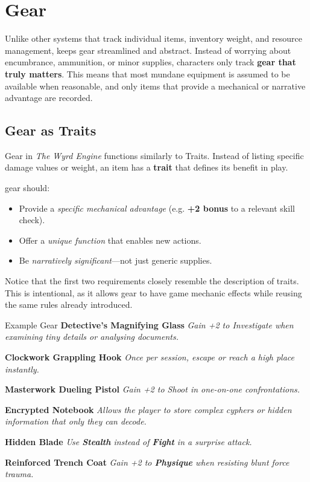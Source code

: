 \section{Gear}

Unlike other systems that track individual items, inventory weight, and resource management, \wyrd keeps gear streamlined and abstract. Instead of worrying about encumbrance, ammunition, or minor supplies, characters only track \textbf{gear that truly matters}. This means that most mundane equipment is assumed to be available when reasonable, and only items that provide a mechanical or narrative advantage are recorded.

\subsection{Gear as Traits}
Gear in \emph{The Wyrd Engine} functions similarly to Traits. Instead of listing specific damage values or weight, an item has a \textbf{trait} that defines its benefit in play. 

\wyrd gear should:
\begin{itemize}
    \item Provide a \emph{specific mechanical advantage} (e.g. \textbf{+2 bonus} to a relevant skill check).
    \item Offer a \emph{unique function} that enables new actions.
    \item Be \emph{narratively significant}—not just generic supplies.
\end{itemize}

Notice that the first two requirements closely resemble the description of traits. This is intentional, as it allows gear to have game mechanic effects while reusing the same rules already introduced.

\begin{CommentBox}{Example Gear}
	\textbf{Detective’s Magnifying Glass}  
	\emph{Gain +2 to Investigate when examining tiny details or analysing documents.}

	\textbf{Clockwork Grappling Hook}  
	\emph{Once per session, escape or reach a high place instantly.}

	\textbf{Masterwork Dueling Pistol}  
	\emph{Gain +2 to Shoot in one-on-one confrontations.}

	\textbf{Encrypted Notebook}  
	\emph{Allows the player to store complex cyphers or hidden information that only they can decode.}

	\textbf{Hidden Blade}  
	\emph{Use \textbf{Stealth} instead of \textbf{Fight} in a surprise attack.}

	\textbf{Reinforced Trench Coat}  
	\emph{Gain +2 to \textbf{Physique} when resisting blunt force trauma.}
\end{CommentBox}

